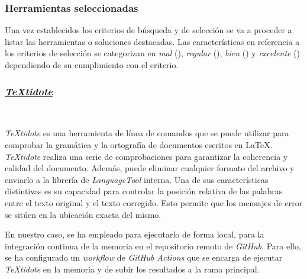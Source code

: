 \subsubsection{Herramientas seleccionadas}

Una vez establecidos los criterios de búsqueda y de selección se va a proceder a listar las herramientas o soluciones destacadas. Las características en referencia a los criterios de selección se categorizan en \textit{mal} (\mal), \textit{regular} (\regular), \textit{bien} (\bien) y \textit{excelente} (\esp) dependiendo de su cumplimiento con el criterio.

\subsubsection{\href{https://github.com/sylvainhalle/textidote}{\textit{TeXtidote}}}~\label{sec:textidote}

\textit{TeXtidote} es una herramienta de línea de comandos que se puede utilizar para comprobar la gramática y la ortografía de documentos escritos en LaTeX. \textit{TeXtidote} realiza una serie de comprobaciones para garantizar la coherencia y calidad del documento. Además, puede eliminar cualquier formato del archivo y enviarlo a la librería de \textit{LanguageTool} interna. Una de sus características distintivas es su capacidad para controlar la posición relativa de las palabras entre el texto original y el texto corregido. Esto permite que los mensajes de error se sitúen en la ubicación exacta del mismo.

En nuestro caso, se ha empleado para ejecutarlo de forma local, para la integración continua de la memoria en el repositorio remoto de \textit{GitHub}. Para ello, se ha configurado un \textit{workflow} de \textit{GitHub Actions} que se encarga de ejecutar \textit{TeXtidote} en la memoria y de subir los resultados a la rama principal.

